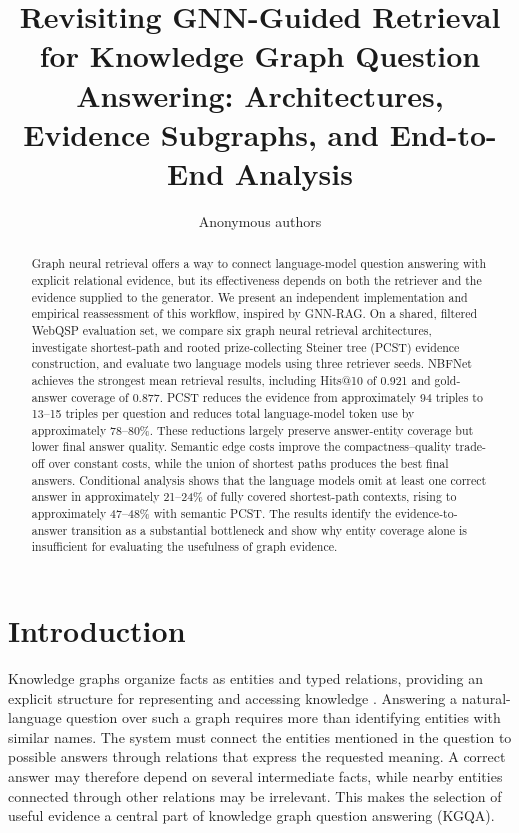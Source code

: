 \documentclass[10pt]{article}
\title{Revisiting GNN-Guided Retrieval for Knowledge Graph Question Answering: Architectures, Evidence Subgraphs, and End-to-End Analysis}
\author{Anonymous authors}
\begin{document}
\maketitle

\begin{abstract}
Graph neural retrieval offers a way to connect language-model question answering with explicit relational evidence, but its effectiveness depends on both the retriever and the evidence supplied to the generator. We present an independent implementation and empirical reassessment of this workflow, inspired by GNN-RAG. On a shared, filtered WebQSP evaluation set, we compare six graph neural retrieval architectures, investigate shortest-path and rooted prize-collecting Steiner tree (PCST) evidence construction, and evaluate two language models using three retriever seeds. NBFNet achieves the strongest mean retrieval results, including Hits@10 of 0.921 and gold-answer coverage of 0.877. PCST reduces the evidence from approximately 94 triples to 13--15 triples per question and reduces total language-model token use by approximately 78--80\%. These reductions largely preserve answer-entity coverage but lower final answer quality. Semantic edge costs improve the compactness--quality trade-off over constant costs, while the union of shortest paths produces the best final answers. Conditional analysis shows that the language models omit at least one correct answer in approximately 21--24\% of fully covered shortest-path contexts, rising to approximately 47--48\% with semantic PCST. The results identify the evidence-to-answer transition as a substantial bottleneck and show why entity coverage alone is insufficient for evaluating the usefulness of graph evidence.
\end{abstract}

\section{Introduction}
\label{sec:introduction}

Knowledge graphs organize facts as entities and typed relations, providing an explicit structure for representing and accessing knowledge \citep{hogan2021knowledge}. Answering a natural-language question over such a graph requires more than identifying entities with similar names. The system must connect the entities mentioned in the question to possible answers through relations that express the requested meaning. A correct answer may therefore depend on several intermediate facts, while nearby entities connected through other relations may be irrelevant. This makes the selection of useful evidence a central part of knowledge graph question answering (KGQA).
\end{document}
